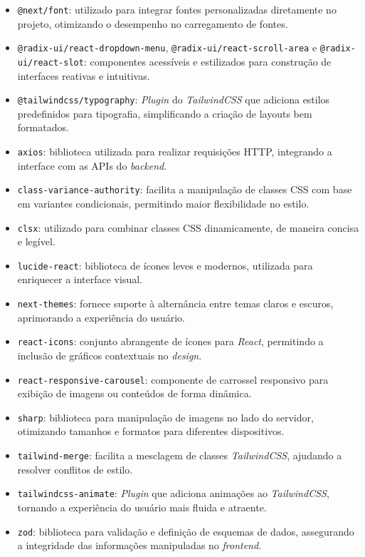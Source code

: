 \begin{itemize} 
  \item \texttt{@next/font}: utilizado para integrar fontes personalizadas diretamente no projeto, otimizando o desempenho no carregamento de fontes. 
  \item \texttt{@radix-ui/react-dropdown-menu}, \texttt{@radix-ui/react-scroll-area} e \texttt{@radix-ui/react-slot}: componentes acessíveis e estilizados para construção de interfaces reativas e intuitivas.
  \item \texttt{@tailwindcss/typography}: \textit{Plugin} do \textit{TailwindCSS} que adiciona estilos predefinidos para tipografia, simplificando a criação de layouts bem formatados. 
  \item \texttt{axios}: biblioteca utilizada para realizar requisições HTTP, integrando a interface com as APIs do \textit{backend}. 
  \item \texttt{class-variance-authority}: facilita a manipulação de classes CSS com base em variantes condicionais, permitindo maior flexibilidade no estilo. 
  \item \texttt{clsx}: utilizado para combinar classes CSS dinamicamente, de maneira concisa e legível. 
  \item \texttt{lucide-react}: biblioteca de ícones leves e modernos, utilizada para enriquecer a interface visual. 
  \item \texttt{next-themes}: fornece suporte à alternância entre temas claros e escuros, aprimorando a experiência do usuário. 
  \item \texttt{react-icons}: conjunto abrangente de ícones para \textit{React}, permitindo a inclusão de gráficos contextuais no \textit{design}. 
  \item \texttt{react-responsive-carousel}: componente de carrossel responsivo para exibição de imagens ou conteúdos de forma dinâmica. 
  \item \texttt{sharp}: biblioteca para manipulação de imagens no lado do servidor, otimizando tamanhos e formatos para diferentes dispositivos. 
  \item \texttt{tailwind-merge}: facilita a mesclagem de classes \textit{TailwindCSS}, ajudando a resolver conflitos de estilo. 
  \item \texttt{tailwindcss-animate}: \textit{Plugin} que adiciona animações ao \textit{TailwindCSS}, tornando a experiência do usuário mais fluida e atraente. 
  \item \texttt{zod}: biblioteca para validação e definição de esquemas de dados, assegurando a integridade das informações manipuladas no \textit{frontend}. \end{itemize}

